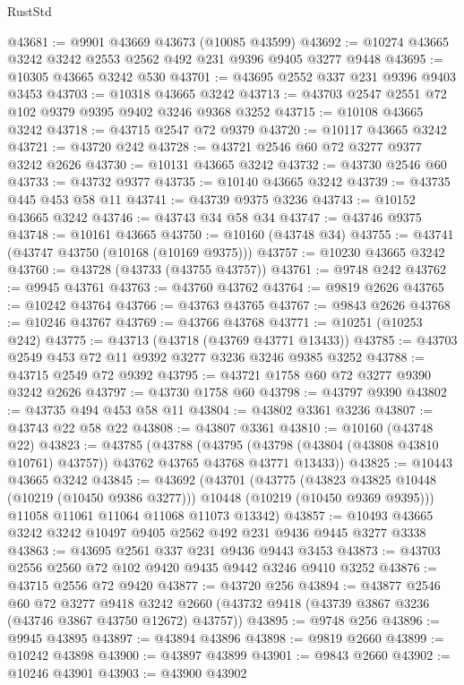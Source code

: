 \begin{lexlean}{RustStd}
\begin{coremodule}
@43681 := @9901 @43669 @43673 (@10085 @43599)
@43692 := @10274 @43665 @3242 @3242 @2553 @2562 @492 @231 @9396 @9405 @3277 @9448
@43695 := @10305 @43665 @3242 @530
@43701 := @43695 @2552 @337 @231 @9396 @9403 @3453
@43703 := @10318 @43665 @3242
@43713 := @43703 @2547 @2551 @72 @102 @9379 @9395 @9402 @3246 @9368 @3252
@43715 := @10108 @43665 @3242
@43718 := @43715 @2547 @72 @9379
@43720 := @10117 @43665 @3242
@43721 := @43720 @242
@43728 := @43721 @2546 @60 @72 @3277 @9377 @3242 @2626
@43730 := @10131 @43665 @3242
@43732 := @43730 @2546 @60
@43733 := @43732 @9377
@43735 := @10140 @43665 @3242
@43739 := @43735 @445 @453 @58 @11
@43741 := @43739 @9375 @3236
@43743 := @10152 @43665 @3242
@43746 := @43743 @34 @58 @34
@43747 := @43746 @9375
@43748 := @10161 @43665
@43750 := @10160 (@43748 @34)
@43755 := @43741 (@43747 @43750 (@10168 (@10169 @9375)))
@43757 := @10230 @43665 @3242
@43760 := @43728 (@43733 (@43755 @43757))
@43761 := @9748 @242
@43762 := @9945 @43761
@43763 := @43760 @43762
@43764 := @9819 @2626
@43765 := @10242 @43764
@43766 := @43763 @43765
@43767 := @9843 @2626
@43768 := @10246 @43767
@43769 := @43766 @43768
@43771 := @10251 (@10253 @242)
@43775 := @43713 (@43718 (@43769 @43771 @13433))
@43785 := @43703 @2549 @453 @72 @11 @9392 @3277 @3236 @3246 @9385 @3252
@43788 := @43715 @2549 @72 @9392
@43795 := @43721 @1758 @60 @72 @3277 @9390 @3242 @2626
@43797 := @43730 @1758 @60
@43798 := @43797 @9390
@43802 := @43735 @494 @453 @58 @11
@43804 := @43802 @3361 @3236
@43807 := @43743 @22 @58 @22
@43808 := @43807 @3361
@43810 := @10160 (@43748 @22)
@43823 := @43785
    (@43788
      (@43795 (@43798 (@43804 (@43808 @43810 @10761) @43757)) @43762 @43765 @43768 @43771 @13433))
@43825 := @10443 @43665 @3242
@43845 := @43692
    (@43701
      (@43775
        (@43823 @43825 @10448 (@10219 (@10450 @9386 @3277)))
        @10448
        (@10219 (@10450 @9369 @9395)))
      @11058
      @11061
      @11064
      @11068
      @11073
      @13342)
@43857 := @10493 @43665 @3242 @3242 @10497 @9405 @2562 @492 @231 @9436 @9445 @3277 @3338
@43863 := @43695 @2561 @337 @231 @9436 @9443 @3453
@43873 := @43703 @2556 @2560 @72 @102 @9420 @9435 @9442 @3246 @9410 @3252
@43876 := @43715 @2556 @72 @9420
@43877 := @43720 @256
@43894 := @43877
    @2546
    @60
    @72
    @3277
    @9418
    @3242
    @2660
    (@43732 @9418 (@43739 @3867 @3236 (@43746 @3867 @43750 @12672) @43757))
@43895 := @9748 @256
@43896 := @9945 @43895
@43897 := @43894 @43896
@43898 := @9819 @2660
@43899 := @10242 @43898
@43900 := @43897 @43899
@43901 := @9843 @2660
@43902 := @10246 @43901
@43903 := @43900 @43902

\end{coremodule}
\end{lexlean}
